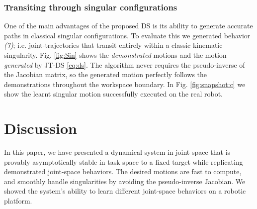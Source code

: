 \documentclass[letterpaper, 10 pt, conference,fleqn]{ieeeconf}
\begin{document}
\begin{table}[t]
	\label{table:2}
	\centering
		\caption{Each simulated trajectory is initialized at $q=[0~\dots~0]^T$. The convergence duration is the time required to move within $0.001$m of the target. The normalized convergence duration is the convergence duration divided by the distance between the initial and target positions.\label{tab:sys}}
		\vspace{-15pt}
\end{table}


\subsubsection{Transiting through singular configurations}
One of the main advantages of the proposed DS is its ability to generate accurate paths in classical singular configurations. To evaluate this we generated behavior \textit{(7)}; i.e. joint-trajectories that transit entirely within a classic kinematic singularity. Fig. \ref{fig:Sin} shows the \textit{demonstrated} motions and the motion  \textit{generated} by JT-DS \eqref{eq:ds}. The algorithm never requires the pseudo-inverse of the Jacobian matrix, so the generated motion perfectly follows the demonstrations throughout the workspace boundary. In Fig. \ref{fig:snapshot:c} we show the learnt singular motion successfully  executed on the real robot.

\section{Discussion} 
\label{Sec:Dis}
In this paper, we have presented a dynamical system in joint space that is provably asymptotically stable in task space to a fixed target while replicating demonstrated joint-space behaviors. The desired motions are fast to compute, and smoothly handle singularities by avoiding the pseudo-inverse Jacobian.  We showed the system's ability to learn different joint-space behaviors on a robotic platform.
\end{document}
